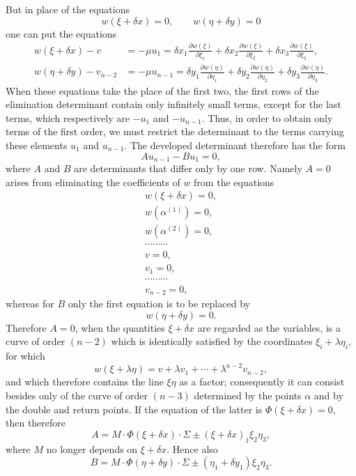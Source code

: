 \documentclass[10pt]{article}
\begin{document}
But in place of the equations
\[
w(\xi+\delta x)=0,\qquad w(\eta+\delta y)=0
\]
one can put the equations
\[
\begin{aligned}
w(\xi+\delta x)-v&=-\mu u_1
=\delta x_1\frac{\partial w(\xi)}{\partial\xi_1}
+\delta x_2\frac{\partial w(\xi)}{\partial\xi_2}
+\delta x_3\frac{\partial w(\xi)}{\partial\xi_3},\\
w(\eta+\delta y)-v_{n-2}&=-\mu u_{n-1}
=\delta y_1\frac{\partial w(\eta)}{\partial\eta_1}
+\delta y_2\frac{\partial w(\eta)}{\partial\eta_2}
+\delta y_3\frac{\partial w(\eta)}{\partial\eta_3}.
\end{aligned}
\]
When these equations take the place of the first two, the first rows of the elimination determinant contain only infinitely small terms, except for the last terms, which respectively are \(-u_1\) and \(-u_{n-1}\). Thus, in order to obtain only terms of the first order, we must restrict the determinant to the terms carrying these elements \(u_1\) and \(u_{n-1}\). The developed determinant therefore has the form
\[
Au_{n-1}-Bu_1=0,
\]
where \(A\) and \(B\) are determinants that differ only by one row. Namely \(A=0\) arises from eliminating the coefficients of \(w\) from the equations
\[
\begin{array}{c}
w(\xi+\delta x)=0,\\
w(\alpha^{(1)})=0,\\
w(\alpha^{(2)})=0,\\[-0.3em]
\cdots\cdots\cdots\\[-0.3em]
v=0,\\
v_1=0,\\[-0.3em]
\cdots\cdots\cdots\\[-0.3em]
v_{n-2}=0,
\end{array}
\]
whereas for \(B\) only the first equation is to be replaced by
\[
w(\eta+\delta y)=0.
\]
Therefore \(A=0\), when the quantities \(\xi+\delta x\) are regarded as the variables, is a curve of order \((n-2)\) which is identically satisfied by the coordinates \(\xi_i+\lambda\eta_i\), for which
\[
w(\xi+\lambda\eta)=v+\lambda v_1+\cdots+\lambda^{n-2}v_{n-2},
\]
and which therefore contains the line \(\xi\eta\) as a factor; consequently it can consist besides only of the curve of order \((n-3)\) determined by the points \(\alpha\) and by the double and return points. If the equation of the latter is \(\Phi(\xi+\delta x)=0\), then therefore
\[
A=M\cdot\Phi(\xi+\delta x)\cdot\Sigma\pm(\xi+\delta x)_1\xi_2\eta_3,
\]
where \(M\) no longer depends on \(\xi+\delta x\). Hence also
\[
B=M\cdot\Phi(\eta+\delta y)\cdot\Sigma\pm(\eta_1+\delta y_1)\xi_2\eta_3.
\]
\end{document}
